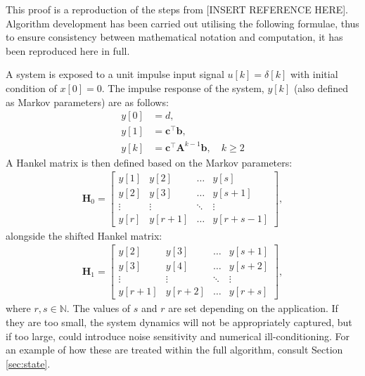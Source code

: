 This proof is a reproduction of the steps from [INSERT REFERENCE HERE]. Algorithm development has been carried out utilising the following formulae, thus to ensure consistency between mathematical notation and computation, it has been reproduced here in full.

A system is exposed to a unit impulse input signal $u[k] = \delta[k]$ with initial condition of $x[0] = 0$. The impulse response of the system, $y[k]$ (also defined as Markov parameters) are as follows:
\begin{subequations}
\label{eq:markov}
\begin{align}
    \label{eq:markov1}
    y[0] &= d,\\
    \label{eq:markov2}
    y[1] &= \mathbf{c}^\top \mathbf{b},\\
    \label{eq:markov3}
    y[k] &= \mathbf{c}^\top \mathbf{A}^{k-1} \mathbf{b}, \quad k \geq 2
\end{align}
\end{subequations}
A Hankel matrix is then defined based on the Markov parameters:
\begin{align}
\label{eq:hankel}
    \mathbf{H}_0 = 
    \begin{bmatrix} 
        y[1] & y[2] & \dots & y[s] \\
        y[2] & y[3] & \dots & y[s+1] \\
        \vdots & \vdots & \ddots & \vdots \\
        y[r] & y[r+1] & \dots & y[r+s-1]
    \end{bmatrix},
\end{align}
alongside the shifted Hankel matrix:
\begin{align}
\label{eq:shift-hankel}
    \mathbf{H}_1 = 
    \begin{bmatrix} 
        y[2] & y[3] & \dots & y[s+1] \\
        y[3] & y[4] & \dots & y[s+2] \\
        \vdots & \vdots & \ddots & \vdots \\
        y[r+1] & y[r+2] & \dots & y[r+s]
    \end{bmatrix},
\end{align}
where $r,s \in \mathbb{N}$. The values of $s$ and $r$ are set depending on the application. If they are too small, the system dynamics will not be appropriately captured, but if too large, could introduce noise sensitivity and numerical ill-conditioning. For an example of how these are treated within the full algorithm, consult Section \ref{sec:state}.

